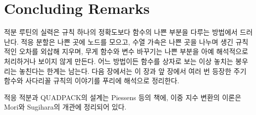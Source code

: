 \section{Concluding Remarks}

적분 루틴의 실력은 규칙 하나의 정확도보다 함수의 나쁜 부분을 다루는 방법에서 드러난다. 적응 분할은 나쁜 곳에 노드를 모으고, 수열 가속은 나쁜 곳을 나누며 생긴 규칙적인 오차를 외삽해 지우며, 무게 함수와 변수 바꾸기는 나쁜 부분을 아예 해석적으로 처리하거나 보이지 않게 만든다. 어느 방법이든 함수를 상자로 보는 이상 놓치는 봉우리는 놓친다는 한계는 남는다. 다음 장에서는 이 장과 앞 장에서 여러 번 등장한 주기 함수와 사다리꼴 규칙의 이야기를 푸리에 해석으로 정리한다.

적응 적분과 QUADPACK의 설계는 Piessens 등의 책\cite{piessens1983quadpack}에, 이중 지수 변환의 이론은 Mori와 Sugihara의 개관\cite{mori2001}에 정리되어 있다.

\chapterreferences
